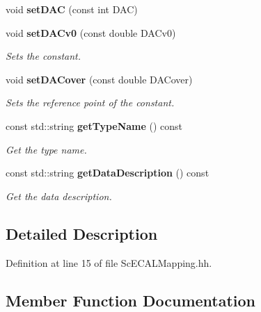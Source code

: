 \begin{DoxyCompactItemize}
\item 
void {\bfseries set\-D\-A\-C} (const int D\-A\-C)\label{classCALICE_1_1ScECALMapping_a364c50c2fc937719ba399528001bf87b}

\item 
void {\bf set\-D\-A\-Cv0} (const double D\-A\-Cv0)\label{classCALICE_1_1ScECALMapping_a33b77ebafb781d5a4700c59660db3f29}

\begin{DoxyCompactList}\small\item\em Sets the constant. \end{DoxyCompactList}\item 
void {\bf set\-D\-A\-Cover} (const double D\-A\-Cover)\label{classCALICE_1_1ScECALMapping_a8885719390a5f0c9e933f223f2eb791f}

\begin{DoxyCompactList}\small\item\em Sets the reference point of the constant. \end{DoxyCompactList}\item 
const std\-::string {\bf get\-Type\-Name} () const 
\begin{DoxyCompactList}\small\item\em Get the type name. \end{DoxyCompactList}\item 
const std\-::string {\bf get\-Data\-Description} () const 
\begin{DoxyCompactList}\small\item\em Get the data description. \end{DoxyCompactList}\end{DoxyCompactItemize}


\subsection{Detailed Description}


Definition at line 15 of file Sc\-E\-C\-A\-L\-Mapping.\-hh.



\subsection{Member Function Documentation}

